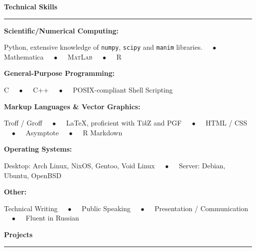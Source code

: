 \documentclass{article}
\numberwithin{equation}{section}
\begin{document}
\vspace{1em}

\textbf{\Large{Technical Skills}} \\[-0.5em]
\rule{\textwidth}{1pt}

\hspace{1.5em} \textbf{Scientific/Numerical Computing:}

\hspace{3.0em} Python, extensive knowledge of \texttt{numpy}, \texttt{scipy} and \texttt{manim} libraries. $\quad\bullet\quad$ Mathematica $\quad\bullet\quad$ \textsc{MatLab} $\quad\bullet\quad$ R

\vspace{0.5em}

\hspace{1.5em} \textbf{General-Purpose Programming:}

\hspace{3.0em} C $\quad\bullet\quad$ C++ $\quad\bullet\quad$ POSIX-compliant Shell Scripting

\vspace{0.5em}

\hspace{1.5em} \textbf{Markup Languages \& Vector Graphics:}

\hspace{3.0em} Troff / Groff $\quad\bullet\quad$ {\LaTeX}, proficient with Ti\textit{k}Z and PGF $\quad\bullet\quad$ HTML / CSS $\quad\bullet\quad$ Asymptote $\quad\bullet\quad$ R Markdown

\vspace{0.5em}

\hspace{1.5em} \textbf{Operating Systems:}

\hspace{3.0em} Desktop: Arch Linux, NixOS, Gentoo, Void Linux $\quad\bullet\quad$ Server: Debian, Ubuntu, OpenBSD

\vspace{0.5em}

\hspace{1.5em} \textbf{Other:}

\hspace{3.0em} Technical Writing $\quad\bullet\quad$ Public Speaking $\quad\bullet\quad$ Presentation / Communication $\quad\bullet\quad$ Fluent in Russian

\vspace{1em}

\textbf{\Large{Projects}} \\[-0.5em]
\rule{\textwidth}{1pt}
\end{document}
